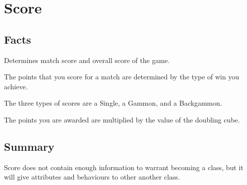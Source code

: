 \section{Score}

\subsection{Facts}

\begin{dashed}
    \item Determines match score and overall score of the game.
    \item The points that you score for a match are determined by the type of win you achieve.
    \item The three types of scores are a Single, a Gammon, and a Backgammon.
    \item The points you are awarded are multiplied by the value of the doubling cube.
\end{dashed}


\subsection{Summary}
Score does not contain enough information to warrant becoming a class, but it will give attributes and behaviours to other another class.
